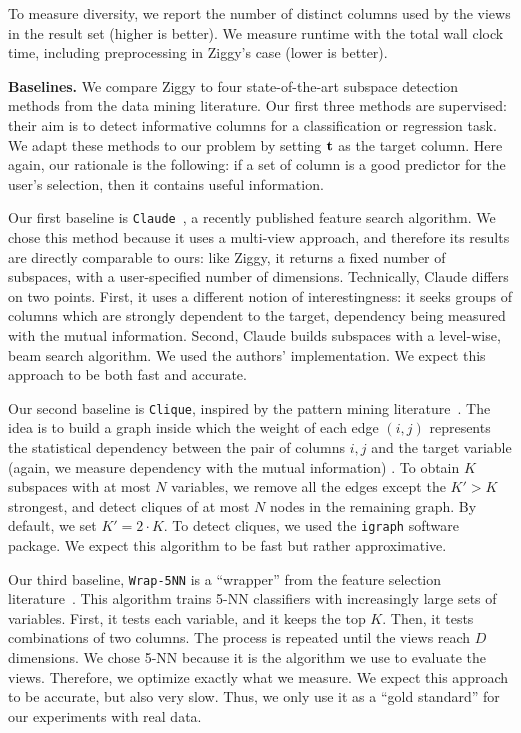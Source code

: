 To measure diversity, we report the number of distinct columns used by the
views in the result set (higher is better). We measure runtime with the total
wall clock time, including preprocessing in Ziggy's case (lower is better).

\textbf{Baselines.} We compare Ziggy to four state-of-the-art subspace
detection methods from the data mining literature. Our first three methods are
supervised: their aim is to detect informative columns for a classification or
regression task.  We adapt these methods to our problem by setting $\bf{t}$ as
the target column. Here again, our rationale is the following: if a set of
column is a good predictor for the user's selection, then it contains useful
information.

Our first baseline is \texttt{Claude}~\cite{Sellam2015Semi}, a recently
published feature search algorithm. We chose this method because it uses a
multi-view approach, and therefore its results are directly comparable to ours:
like Ziggy, it returns a fixed number of subspaces, with a user-specified
number of dimensions.  Technically, Claude differs on two points. First, it
uses a different notion of interestingness: it seeks groups of columns which
are strongly dependent to the target, dependency being measured with the mutual
information. Second, Claude builds subspaces with a level-wise, beam search
algorithm. We used the authors' implementation.  We expect this approach to be
both fast and accurate.

Our second baseline is \texttt{Clique}, inspired by the pattern mining
literature~\cite{xie2010max}. The idea is to build a graph inside which the
weight of each edge $(i,j)$ represents the statistical dependency between the
pair of columns $i,j$ and the target variable (again, we measure dependency
with the mutual information) . To obtain $K$ subspaces with at most $N$
variables, we remove all the edges except the $K' > K$ strongest, and detect
cliques of at most $N$ nodes in the remaining graph. By default, we set $K' =
2\cdot K$. To detect cliques, we used the \texttt{igraph} software package. We
expect this algorithm to be fast but rather approximative.

Our third baseline, \texttt{Wrap-5NN} is a ``wrapper'' from the feature
selection literature~\cite{guyon2003introduction}. This algorithm trains 5-NN
classifiers with increasingly large sets of variables. First, it tests each
variable, and it keeps the top $K$. Then, it tests combinations of two columns.
The process is repeated until the views reach $D$ dimensions. We chose 5-NN
because it is the algorithm we use to evaluate the views. Therefore, we
optimize exactly what we measure. We expect this approach to be accurate, but
also very slow. Thus, we only use it as a ``gold standard'' for our experiments
with real data.

